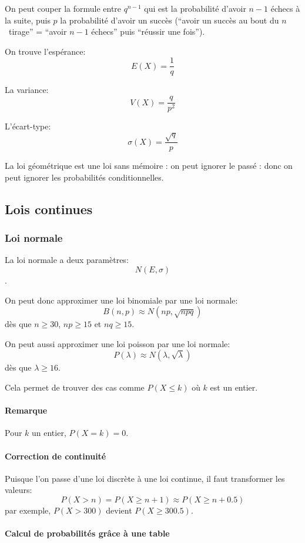 \documentclass[10pt,a4paper,french]{article}
\begin{document}
On peut couper la formule entre $q^{n-1}$ qui est la probabilité d'avoir $n-1$ échecs à la suite, puis $p$ la probabilité d'avoir un succès (``avoir un succès au bout du $n$\ieme~tirage'' = ``avoir $n-1$ échecs'' puis ``réussir une fois'').

On trouve l'espérance: \[E(X) = \frac{1}{q}\]

La variance: \[V(X) = \frac{q}{p^2}\]

L'écart-type: \[\sigma(X) = \frac{\sqrt{q}}{p}\]

La loi géométrique est une loi sans mémoire : on peut ignorer le passé : donc on peut ignorer les probabilités conditionnelles.

\subsection{Lois continues}

\subsubsection{Loi normale}

La loi normale a deux paramètres: \[N(E, \sigma)\].

On peut donc approximer une loi binomiale par une loi normale: \[ B(n, p) \approx N(np, \sqrt{npq}) \] dès que $n \geq 30$, $np \geq 15$ et $nq \geq 15$.

On peut aussi approximer une loi poisson par une loi normale: \[P(\lambda) \approx N(\lambda, \sqrt{\lambda})\] dès que $\lambda \geq 16$.

Cela permet de trouver des cas comme $P(X \leq k)$ où $k$ est un entier.

\paragraph{Remarque}
Pour $k$ un entier, $P(X = k) = 0$.

\paragraph{Correction de continuité}
Puisque l'on passe d'une loi discrète à une loi continue, il faut transformer les valeurs: \[ P(X > n) = P(X \geq n+1) \approx P(X \geq n+0.5) \]
par exemple, $P(X > 300)$ devient $P(X \geq 300.5)$.

\paragraph{Calcul de probabilités grâce à une table}
\end{document}
